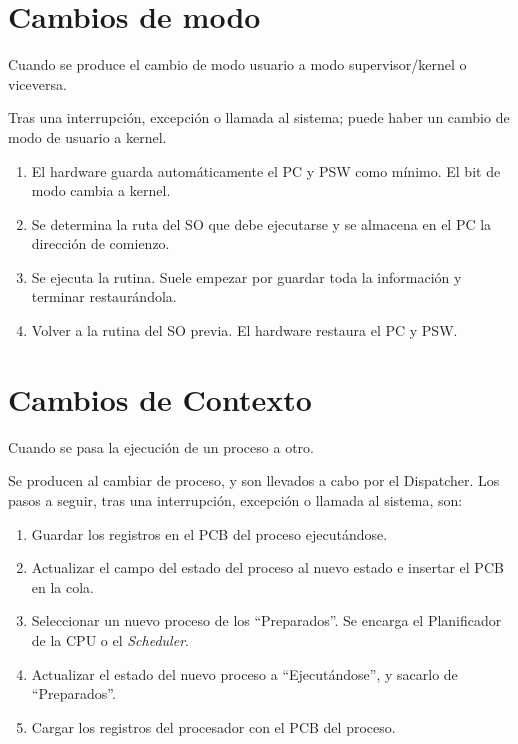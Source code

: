 \section{Cambios de modo}
\begin{definicion}  Cuando se produce el cambio de modo usuario a modo supervisor/kernel o viceversa.
\end{definicion}
Tras una interrupción, excepción o llamada al sistema; puede haber un cambio de modo de usuario a kernel.
\begin{enumerate}
    \item El hardware guarda automáticamente el PC y PSW como mínimo. El bit de modo cambia a kernel.
    \item Se determina la ruta del SO que debe ejecutarse y se almacena en el PC la dirección de comienzo.
    \item Se ejecuta la rutina. Suele empezar por guardar toda la información y terminar restaurándola.
    \item Volver a la rutina del SO previa. El hardware restaura el PC y PSW.
\end{enumerate}

\section{Cambios de Contexto}
\begin{definicion}  Cuando se pasa la ejecución de un proceso a otro.
\end{definicion}
Se producen al cambiar de proceso, y son llevados a cabo por el Dispatcher. Los pasos a seguir, tras una interrupción, excepción o llamada al sistema, son:
\begin{enumerate}
    \item Guardar los registros en el PCB del proceso ejecutándose.
    \item Actualizar el campo del estado del proceso al nuevo estado e insertar el PCB en la cola.
    \item Seleccionar un nuevo proceso de los ``Preparados''. Se encarga el Planificador de la CPU o el \textit{Scheduler}.
    \item Actualizar el estado del nuevo proceso a ``Ejecutándose'', y sacarlo de ``Preparados''.
    \item Cargar los registros del procesador con el PCB del proceso.
\end{enumerate}




